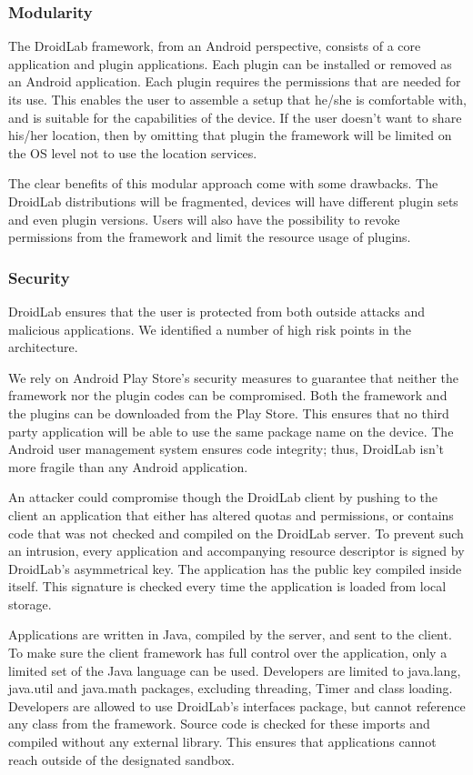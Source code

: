 \documentclass[conference,letterpaper]{IEEEtran}
\begin{document}
\subsubsection{Modularity}
The DroidLab framework, from an Android perspective, consists of a core application and plugin applications. Each plugin can be installed or removed as an Android application. Each plugin requires the permissions that are needed for its use. This enables the user to assemble a setup that he/she is comfortable with, and is suitable for the capabilities of the device. If the user doesn't want to share his/her location, then by omitting that plugin the framework will be limited on the OS level not to use the location services.

The clear benefits of this modular approach come with some drawbacks. The DroidLab distributions will be fragmented, devices will have different plugin sets and even plugin versions. Users will also have the possibility to revoke permissions from the framework and limit the resource usage of plugins.

\subsubsection{Security}
DroidLab ensures that the user is protected from both outside attacks and malicious applications. We identified a number of high risk points in the architecture.

We rely on Android Play Store's security measures to guarantee that neither the framework nor the plugin codes can be compromised. Both the framework and the plugins can be downloaded from the Play Store. This ensures that no third party application will be able to use the same package name on the device. The Android user management system ensures code integrity; thus, DroidLab isn't more fragile than any Android application.

An attacker could compromise though the DroidLab client by pushing to the client an application that either has altered quotas and permissions, or contains code that was not checked and compiled on the DroidLab server. To prevent such an intrusion, every application and accompanying resource descriptor is signed by DroidLab's asymmetrical key. The application has the public key compiled inside itself. This signature is checked every time the application is loaded from local storage.

Applications are written in Java, compiled by the server, and sent to the client. To make sure the client framework has full control over the application, only a limited set of the Java language can be used. Developers are limited to java.lang, java.util and java.math packages, excluding threading, Timer and class loading. Developers are allowed to use DroidLab's interfaces package, but cannot reference any class from the framework. Source code is checked for these imports and compiled without any external library. This ensures that applications cannot reach outside of the designated sandbox.
\end{document}
